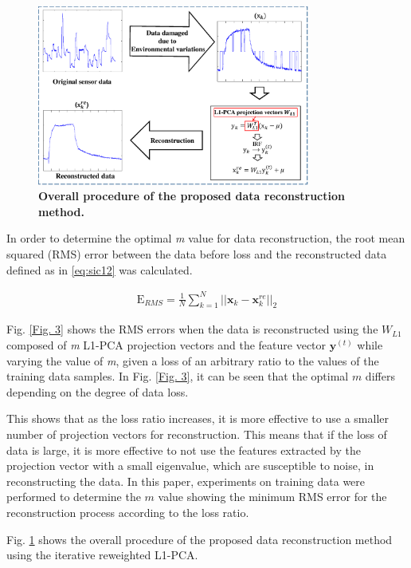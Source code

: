 \documentclass[10pt,letterpaper]{article}
\begin{document}
\begin{figure}[h]
	\centering
    \includegraphics[width=0.8\textwidth]{_4.eps}
    \caption{\bf{Overall procedure of the proposed data reconstruction method.}\label{Fig. 4}}
\end{figure}

In order to determine the optimal \textit{m} value for data reconstruction, the root mean squared (RMS) error between the data before loss and the reconstructed data  defined as in \ref{eq:sic12} was calculated. 

\begin{eqnarray}
\label{eq:sic12}
	\mathrm E_{RMS} = \frac{1}{N}\sum\limits_{k=1}^{N}||\mathbf{x}_k-\mathbf{x}_k^{re}||_2
\end{eqnarray}


Fig. \ref{Fig. 3} shows the RMS errors when the data is reconstructed using the $W_{L1}$ composed of \textit{m} L1-PCA projection vectors and the feature vector $\textbf{y}^{(t)}$ while varying the value of \textit{m}, given a loss of an arbitrary ratio to the values of the training data samples. 
In Fig. \ref{Fig. 3}, it can be seen that the optimal $m$ differs depending on the degree of data loss. 

This shows that as the loss ratio increases, it is more effective to use a smaller number of projection vectors for reconstruction. 
This means that if the loss of data is large, it is more effective to not use the features extracted by the projection vector with a small eigenvalue, which are susceptible to noise, in reconstructing the data.
In this paper, experiments on training data were performed to determine the $m$ value showing the minimum RMS error for the reconstruction process according to the loss ratio.



Fig. \ref{Fig. 4} shows the overall procedure of the proposed data reconstruction method using the iterative reweighted L1-PCA. 
\end{document}
